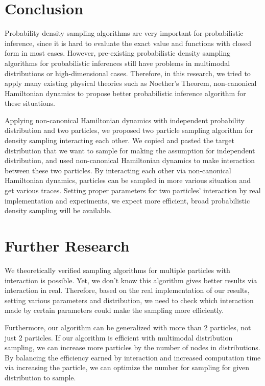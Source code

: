 \documentclass{article}
\begin{document}
\section{Conclusion}

Probability density sampling algorithms are very important for probabilistic inference, since it is hard to evaluate the exact value and functions with closed form in most cases. However, pre-existing probabilistic density sampling algorithms for probabilistic inferences still have problems in multimodal distributions or high-dimensional cases. Therefore, in this research, we tried to apply many existing physical theories such as Noether's Theorem, non-canonical Hamiltonian dynamics to propose better probabilistic inference algorithm for these situations. 

Applying non-canonical Hamiltonian dynamics with independent probability distribution and two particles, we proposed two particle sampling algorithm for density sampling interacting each other. We copied and pasted the target distribution that we want to sample for making the assumption for independent distribution, and used non-canonical Hamiltonian dynamics to make interaction between these two particles. By interacting each other via non-canonical Hamiltonian dynamics, particles can be sampled in more various situation and get various traces. Setting proper parameters for two particles' interaction by real implementation and experiments, we expect more efficient, broad probabilistic density sampling will be available.  

\section{Further Research}

We theoretically verified sampling algorithms for multiple particles with interaction is possible. Yet, we don't know this algorithm gives better results via interaction in real. Therefore, based on the real implementation of our results, setting various parameters and distribution, we need to check which interaction made by certain parameters could make the sampling more efficiently. 

Furthermore, our algorithm can be generalized with more than 2 particles, not just 2 particles. If our algorithm is efficient with multimodal distribution sampling, we can increase more particles by the number of nodes in distributions.  By balancing the efficiency earned by interaction and increased computation time via increasing the particle, we can optimize the number for sampling for given distribution to sample.
\end{document}
